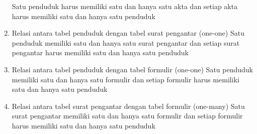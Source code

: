 \begin{enumerate}
Satu penduduk harus memiliki satu dan hanya satu akta dan setiap akta harus memiliki satu dan hanya satu penduduk\\
\item Relasi antara tabel penduduk dengan tabel surat pengantar (one-one)
Satu penduduk memiliki satu dan hanya satu surat pengantar dan setiap surat pengantar harus memiliki satu dan hanya satu penduduk\\
\item Relasi antara tabel penduduk dengan tabel formulir (one-one)
Satu penduduk memiliki satu dan hanya satu formulir dan setiap formulir harus memiliki satu dan hanya satu penduduk\\
\item Relasi antara tabel surat pengantar dengan tabel formulir (one-many)
Satu surat pengantar memiliki satu dan hanya satu formulir dan setiap formulir harus memiliki satu dan hanya satu penduduk\\
\end{enumerate}

